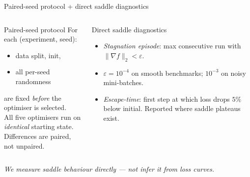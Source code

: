 \documentclass[11pt,aspectratio=169]{beamer}
\begin{document}
\begin{frame}{Paired-seed protocol + direct saddle diagnostics}
  \begin{columns}[T,onlytextwidth]
      \begin{block}{Paired-seed protocol}
        \small
        For each (experiment, seed):
        \begin{itemize}
          \item data split, init,
          \item all per-seed randomness
        \end{itemize}
        are fixed \emph{before} the optimiser is selected.\\[0.3em]
        All five optimisers run on \emph{identical} starting state.\\[0.3em]
        \alert{Differences are paired,} not unpaired.
      \end{block}
      \begin{block}{Direct saddle diagnostics}
        \small
        \begin{itemize}
          \item \emph{Stagnation episode}: max consecutive run with
                \(\|\nabla f\|_2 < \varepsilon\).
          \item \(\varepsilon = 10^{-4}\) on smooth benchmarks; \(10^{-3}\) on
                noisy mini-batches.
          \item \emph{Escape-time}: first step at which loss drops $5\%$
                below initial. Reported where saddle plateaus exist.
        \end{itemize}
      \end{block}
  \end{columns}
  \vspace{0.5em}
  \emph{We measure saddle behaviour directly --- not infer it from loss curves.}
\end{frame}
\end{document}
